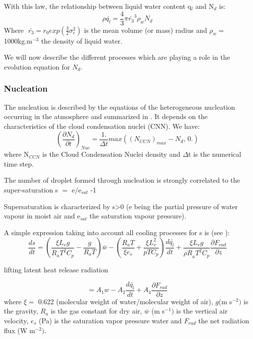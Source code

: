 With this law, the relationship between liquid water content q$_{l}$ and
N$_{d}$ is:
\begin{equation}
\rho \bar{q_{l}}=\frac{4}{3}\pi \bar{r_{3}}^{3}\rho_{w}N_{d}
\end{equation}
Where$\, \, \, \, \bar{r_{3}}=r_{0}exp\left( \frac{3}{2}\sigma_{c}^{2}
\right)$ is the mean volume (or mass) radius and $\rho
_{w}=$1000kg.m$^{-3}$ the density of liquid water.

We will now describe the different processes which are playing a role in the
evolution equation for $N_{d}$.

\subsubsection{Nucleation}
The nucleation is described by the equations of the heterogeneous nucleation
occurring in the atmosphere and summarized in
\cite{Pruppacher:2000}. It depends on the characteristics of the cloud condensation nuclei
(CNN). We have:
\begin{equation}
\left( \frac{\partial N_{d}}{\partial t} \right)_{Nuc}=\frac{1.}{\Delta
t}max\left( \left( N_{CCN} \right)_{max}-N_{d},\, 0. \right)
\end{equation}
where N$_{CCN}$ is the Cloud Condensation Nuclei density and $\Delta $t is
the numerical time step.

The number of droplet formed through nucleation is strongly correlated to
the super-saturation
\newline
s $=$ e/e$_{sat}$ -1

 Supersaturation is characterized by s\textgreater 0
(e being the partial pressure of water vapour in moist
air and e$_{sat}$ the saturation vapour pressure).

A simple expression taking into account all cooling processes for s is (see
\cite{Zhang:2014}):
\begin{equation}
\frac{ds}{dt}=\left( \frac{\xi L_{v}g}{R_{a}T^{2}C_{p}}-\frac{g}{R_{a}T}
\right)\bar{w}-\left( \frac{R_{a}T}{\xi e_{s}}+\frac{\xi L_{v}^{2}}{pTC_{p}}
\right)\frac{d\bar{q_{l}}}{dt}+\frac{\xi L_{v}g}{{\rho
R}_{a}T^{2}C_{p}}\frac{\partial F_{rad}}{\partial z}
\end{equation}
\begin{center}
lifting \quad	\quad \quad \quad \quad \quad \quad \quad \quad latent	\quad heat \quad	release \quad	radiation
\end{center}
\begin{equation}
=A_{1}w-A_{2}\frac{d\bar{q_{l}}}{dt}+A_{4}\frac{\partial F_{rad}}{\partial
z}
\end{equation}
where $\xi =$ 0.622 (molecular weight of water/molecular
weight of air), $g $(m s$^{-2})$ is the gravity, $R_{a}$ is the gas constant for
dry air, $\bar{w}$ (m s$^{-1})$ is the vertical air velocity, $e_{s}$ (Pa) is
the saturation vapor pressure water and $F_{rad}$ the net radiation flux (W
m$^{-2})$.

